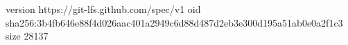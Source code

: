 version https://git-lfs.github.com/spec/v1
oid sha256:3b4fb646e88f4d026aac401a2949c6d88d487d2eb3e300d195a51ab0e0a2f1c3
size 28137

